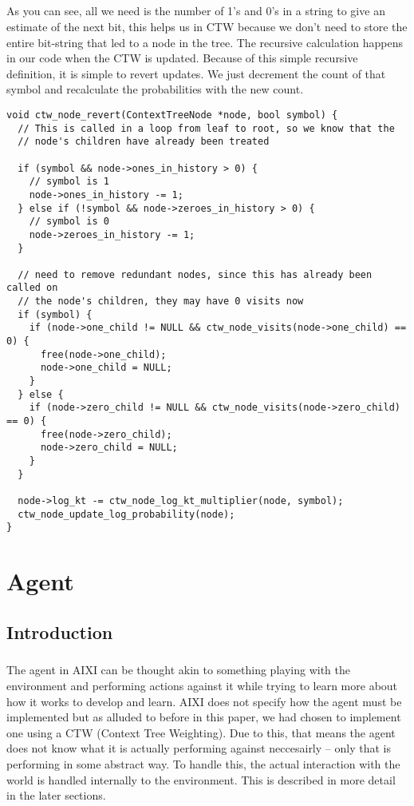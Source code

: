 \documentclass[fancychapters]{report}   	%
\begin{document}
\paragraph{}As you can see, all we need is the number of 1's and 0's in a string to give an estimate of the next bit, this helps us in CTW because we don't need to store the entire bit-string that led to a node in the tree. The recursive calculation happens in our code when the CTW is updated. Because of this simple recursive definition, it is simple to revert updates. We just decrement the count of that symbol and recalculate the probabilities with the new count.

\begin{lstlisting}
void ctw_node_revert(ContextTreeNode *node, bool symbol) {
  // This is called in a loop from leaf to root, so we know that the
  // node's children have already been treated
  
  if (symbol && node->ones_in_history > 0) {
    // symbol is 1
    node->ones_in_history -= 1;
  } else if (!symbol && node->zeroes_in_history > 0) {
    // symbol is 0
    node->zeroes_in_history -= 1;
  }

  // need to remove redundant nodes, since this has already been called on
  // the node's children, they may have 0 visits now
  if (symbol) {
    if (node->one_child != NULL && ctw_node_visits(node->one_child) == 0) {
      free(node->one_child);
      node->one_child = NULL;
    }
  } else {
    if (node->zero_child != NULL && ctw_node_visits(node->zero_child) == 0) {
      free(node->zero_child);
      node->zero_child = NULL;
    }
  }

  node->log_kt -= ctw_node_log_kt_multiplier(node, symbol);
  ctw_node_update_log_probability(node);
}
\end{lstlisting}

\chapter{Agent}
\section{Introduction}

\paragraph{}
The agent in AIXI can be thought akin to something playing with the environment and performing actions against it while trying to learn more about how it works to develop and learn. AIXI does not specify how the agent must be implemented but as alluded to before in this paper, we had chosen to implement one using a CTW (Context Tree Weighting). Due to this, that means the agent does not know what it is actually performing against neccesairly -- only that is performing in some abstract way. To handle this, the actual interaction with the world is handled internally to the environment. This is described in more detail in the later sections.
\end{document}
